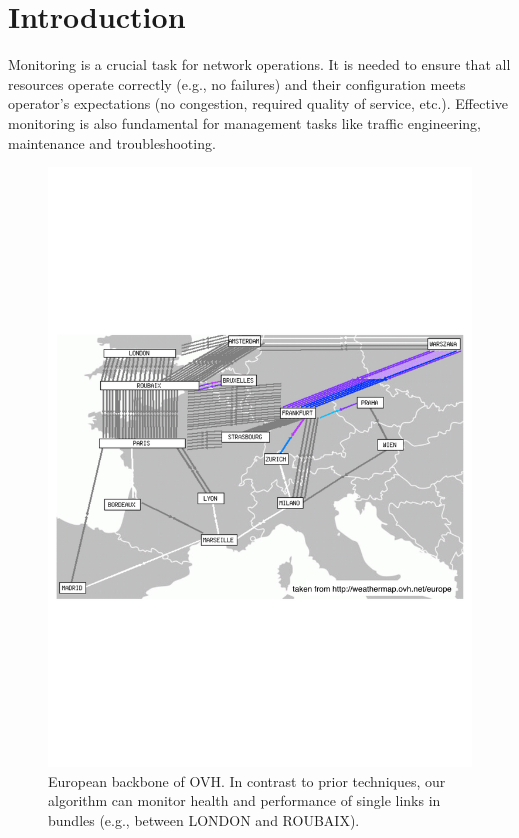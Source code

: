 
\section*{Introduction}

Monitoring is a crucial task for network operations. It is needed to ensure that all resources operate correctly (e.g., no
failures) and their configuration meets operator’s expectations (no congestion, required quality of service, etc.). Effective
monitoring is also fundamental for management tasks like traffic engineering, maintenance and troubleshooting.

\begin{figure}
\begin{center}
\includegraphics[width=.85\columnwidth]{figures/ovh-eu.pdf}
\end{center}
\caption{European backbone of \textsf{OVH}. In contrast to prior techniques, our algorithm can monitor health and performance of single
links in bundles (e.g., between \textsf{LONDON} and \textsf{ROUBAIX}).}
\label{fig:ovh}
\end{figure}


